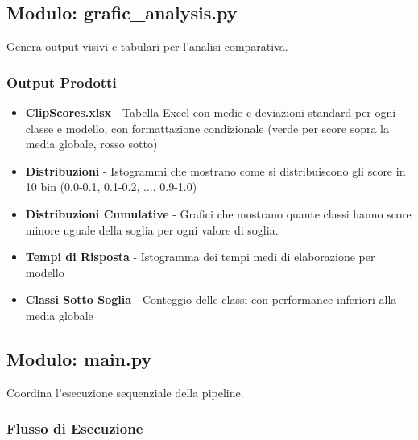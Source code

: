 \documentclass{article}
\begin{document}
\subsection{Modulo: grafic\_analysis.py}

Genera output visivi e tabulari per l'analisi comparativa.

\subsubsection{Output Prodotti}

\begin{itemize}
    \item \textbf{ClipScores.xlsx} - Tabella Excel con medie e deviazioni standard per ogni classe e modello, con formattazione condizionale (verde per score sopra la media globale, rosso sotto)
    
    \item \textbf{Distribuzioni} - Istogrammi che mostrano come si distribuiscono gli score in 10 bin (0.0-0.1, 0.1-0.2, ..., 0.9-1.0)
    
    \item \textbf{Distribuzioni Cumulative} - Grafici che mostrano quante classi hanno score minore uguale della soglia per ogni valore di soglia.
    
    \item \textbf{Tempi di Risposta} - Istogramma dei tempi medi di elaborazione per modello
    
    \item \textbf{Classi Sotto Soglia} - Conteggio delle classi con performance inferiori alla media globale
\end{itemize}

\subsection{Modulo: main.py}

Coordina l'esecuzione sequenziale della pipeline.

\subsubsection{Flusso di Esecuzione}
\end{document}
